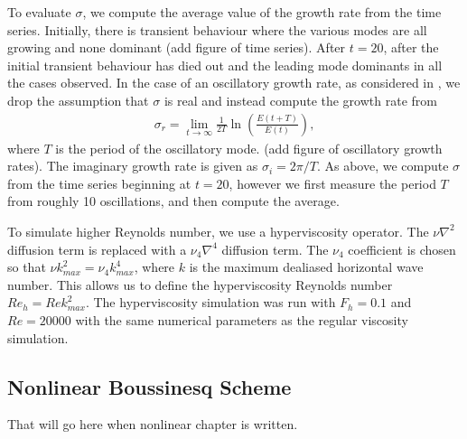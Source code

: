 To evaluate $\sigma$, we compute the average value of the growth rate from the time series. Initially, there is transient behaviour where the various modes are all growing and none dominant (add figure of time series). After $t=20$, after the initial transient behaviour has died out and the leading mode dominants in all the cases observed. In the case of an oscillatory growth rate, as considered in \cite{bc1999}, we drop the assumption that $\sigma$ is real and instead compute the growth rate from
\begin{align}
\sigma_{r} = \lim_{t\rightarrow \infty} \frac{1}{2T}\ln\left(\frac{E(t+T)}{E(t)}\right)\label{sigma2},
\end{align}
where $T$ is the period of the oscillatory mode. (add figure of oscillatory growth rates). The imaginary growth rate is given as $\sigma_{i}=2\pi/T$. As above, we compute $\sigma$ from the time series beginning at $t=20$, however we first measure the period $T$ from roughly 10 oscillations, and then compute the average.  


To simulate higher Reynolds number, we use a hyperviscosity operator. The $\nu\nabla^{2}$ diffusion term is replaced with a $\nu_{4}\nabla^{4}$ diffusion term. The $\nu_{4}$ coefficient is chosen so that $\nu k_{max}^{2} = \nu_{4}k_{max}^{4}$, where $k$ is the maximum dealiased horizontal wave number. This allows us to define the hyperviscosity Reynolds number $Re_{h}=Re k_{max}^{2}$. The hyperviscosity simulation was run with $F_{h}=0.1$ and $Re=20000$ with the same numerical parameters as the regular viscosity simulation.

\subsection{Nonlinear Boussinesq Scheme}

That will go here when nonlinear chapter is written. 
